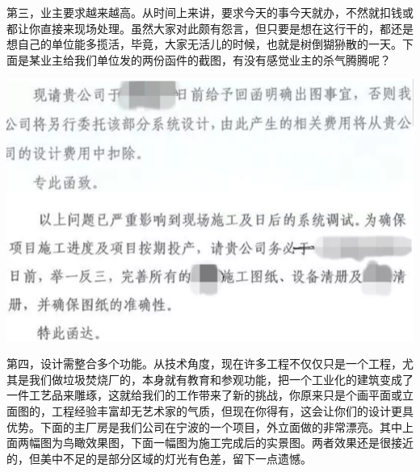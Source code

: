 \documentclass[]{book}
\begin{document}
第三，业主要求越来越高。从时间上来讲，要求今天的事今天就办，不然就扣钱或都让你直接来现场处理。虽然大家对此颇有怨言，但只要是想在这行干的，都还是想自己的单位能多揽活，毕竟，大家无活儿的时候，也就是树倒猢狲散的一天。下面是某业主给我们单位发的两份函件的截图，有没有感觉业主的杀气腾腾呢？

\includegraphics[width=8.33in]{images/sisi4}

第四，设计需整合多个功能。从技术角度，现在许多工程不仅仅只是一个工程，尤其是我们做垃圾焚烧厂的，本身就有教育和参观功能，把一个工业化的建筑变成了一件工艺品来雕琢，这就给我们的工作带来了新的挑战，你原来只是个画平面或立面图的，工程经验丰富却无艺术家的气质，但现在你得有，这会让你们的设计更具优势。下面的主厂房是我们公司在宁波的一个项目，外立面做的非常漂亮。其中上面两幅图为鸟瞰效果图，下面一幅图为施工完成后的实景图。两者效果还是很接近的，但美中不足的是部分区域的灯光有色差，留下一点遗憾。
\end{document}
